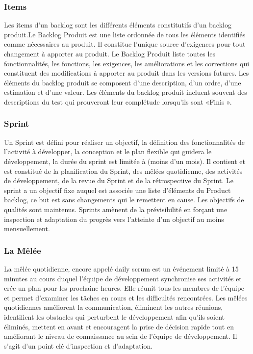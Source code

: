 \subsubsection{Items}
Les items d'un backlog sont les différents éléments constitutifs d'un backlog produit.Le Backlog Produit est une liste ordonnée de tous les éléments identifiés comme nécessaires au produit. Il constitue l’unique source d'exigences pour tout changement à apporter au produit. Le Backlog Produit liste toutes les fonctionnalités, les fonctions, les exigences, les améliorations et les corrections qui constituent des modifications à apporter au produit dans les versions futures. Les éléments du backlog produit se composent d'une description, d'un ordre, d'une
estimation et d'une valeur. Les éléments du backlog produit incluent souvent des descriptions du test qui prouveront leur complétude lorsqu’ils sont «Finis ».

\subsubsection{Sprint}
Un Sprint est défini pour réaliser un objectif, la définition des fonctionnalités de l’activité à développer, la conception et le plan flexible qui guidera le développement, la durée du sprint est limitée à  (moins d’un mois).
Il contient et est constitué de la planification du Sprint, des mêlées quotidienne, des activités de développement, de la revue du Sprint et de la rétrospective du Sprint.
Le sprint a un objectif fixe auquel est associée une liste d’éléments du Product backlog, ce but est sans changements qui le remettent en cause. Les objectifs de qualités sont maintenus.
Sprints amènent de la prévisibilité en forçant une inspection et adaptation du progrès vers l’atteinte d’un objectif au moins mensuellement.

\subsubsection{La Mêlée}
La mêlée quotidienne, encore appelé daily scrum est un événement limité à 15 minutes au cours duquel l'équipe de développement synchronise ses activités et crée un plan pour les prochaine heures.
Elle réunit tous les membres de l’équipe et permet d’examiner les tâches en cours et les difficultés rencontrées.
Les mêlées quotidiennes améliorent la communication, éliminent les autres réunions, identifient
les obstacles qui perturbent le développement afin qu'ils soient éliminés, mettent en avant et encouragent la prise de décision rapide tout en améliorant le niveau de connaissance au sein de l’équipe de développement. Il s’agit d’un point clé d’inspection et d’adaptation.
